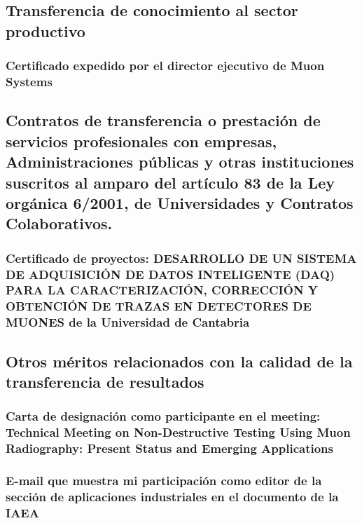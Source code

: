 \documentclass[a4paper, 11pt, twoside, openright]{report}
\begin{document}
\subsection{Transferencia de conocimiento al sector productivo}

\subsubsection{Certificado expedido por el director ejecutivo de Muon Systems}


\subsection{Contratos de transferencia o prestación de servicios profesionales con empresas, Administraciones públicas y otras 	instituciones suscritos al amparo del artículo 83 de la Ley orgánica 6/2001, de Universidades y Contratos Colaborativos.}

\subsubsection{Certificado de proyectos: DESARROLLO DE UN SISTEMA DE ADQUISICIÓN DE DATOS INTELIGENTE (DAQ) PARA LA CARACTERIZACIÓN, CORRECCIÓN Y OBTENCIÓN DE TRAZAS EN 	DETECTORES DE MUONES de la Universidad de Cantabria}


\subsection{Otros méritos relacionados con la calidad de la transferencia de resultados}

\subsubsection{Carta de designación como participante en el meeting: Technical Meeting on Non-Destructive Testing Using Muon Radiography: Present Status and Emerging Applications}


\subsubsection{E-mail que muestra mi participación como editor de la sección de aplicaciones industriales en el documento de la IAEA}

\end{document}
